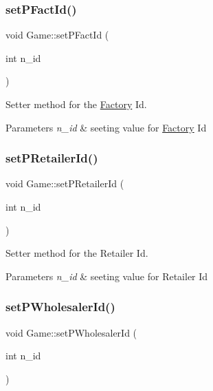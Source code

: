 \subsubsection{\texorpdfstring{set\+P\+Fact\+Id()}{setPFactId()}}
{\footnotesize\ttfamily void Game\+::set\+P\+Fact\+Id (\begin{DoxyParamCaption}\item[{int}]{n\+\_\+id }\end{DoxyParamCaption})}



Setter method for the \hyperlink{class_factory}{Factory} Id. 


\begin{DoxyParams}{Parameters}
{\em n\+\_\+id} & seeting value for \hyperlink{class_factory}{Factory} Id \\
\hline
\end{DoxyParams}
\mbox{\label{class_game_a80b5a91e9262403dfac82f961056c79a}} 
\subsubsection{\texorpdfstring{set\+P\+Retailer\+Id()}{setPRetailerId()}}
{\footnotesize\ttfamily void Game\+::set\+P\+Retailer\+Id (\begin{DoxyParamCaption}\item[{int}]{n\+\_\+id }\end{DoxyParamCaption})}



Setter method for the Retailer Id. 


\begin{DoxyParams}{Parameters}
{\em n\+\_\+id} & seeting value for Retailer Id \\
\hline
\end{DoxyParams}
\mbox{\label{class_game_a945968b2490656de58ce89b653eb30e8}} 
\subsubsection{\texorpdfstring{set\+P\+Wholesaler\+Id()}{setPWholesalerId()}}
{\footnotesize\ttfamily void Game\+::set\+P\+Wholesaler\+Id (\begin{DoxyParamCaption}\item[{int}]{n\+\_\+id }\end{DoxyParamCaption})}



